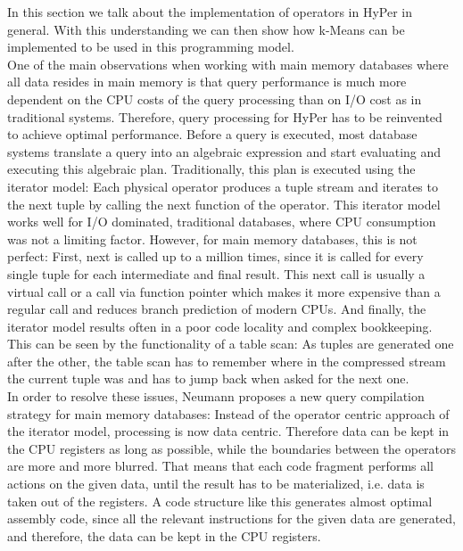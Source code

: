 In this section we talk about the implementation of operators in HyPer in general. With this understanding we can then show how k-Means can be implemented to be used in this programming model. 
\\
One of the main observations when working with main memory databases where all data resides in main memory is that query performance is much more dependent on the CPU costs of the query processing than on I/O cost as in traditional systems. Therefore, query processing for HyPer has to be reinvented to achieve optimal performance.
Before a query is executed, most database systems translate a query into an algebraic expression and start evaluating and executing this algebraic plan. Traditionally, this plan is executed using the iterator model: Each physical operator produces a tuple stream and iterates to the next tuple by calling the next function of the operator. This iterator model works well for I/O dominated, traditional databases, where CPU consumption was not a limiting factor. However, for main memory databases, this is not perfect: First, next is called up to a million times, since it is called for every single tuple for each intermediate and final result. This next call is usually a virtual call or a call via function pointer which makes it more expensive than a regular call and reduces branch prediction of modern CPUs. And finally, the iterator model results often in a poor code locality and complex bookkeeping. This can be seen by the functionality of a table scan: As tuples are generated one after the other, the table scan has to remember where in the compressed stream the current tuple was and has to jump back when asked for the next one. 
\\
In order to resolve these issues, Neumann proposes a new query compilation strategy for main memory databases: Instead of the operator centric approach of the iterator model, processing is now data centric. Therefore data can be kept in the CPU registers as long as possible, while the boundaries between the operators are more and more blurred. That means that each code fragment performs all actions on the given data, until the result has to be materialized, i.e. data is taken out of the registers. A code structure like this generates almost optimal assembly code, since all the relevant instructions for the given data are generated, and therefore, the data can be kept in the CPU registers.
\\
